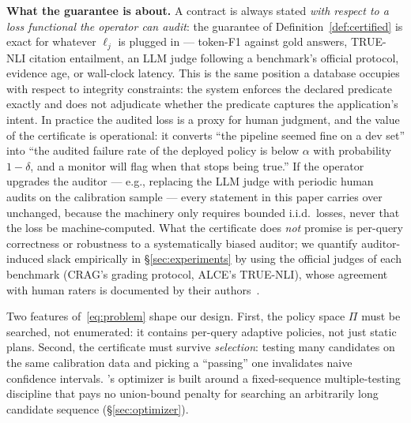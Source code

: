 \textbf{What the guarantee is about.} A contract is always stated
\emph{with respect to a loss functional the operator can audit}: the
guarantee of Definition~\ref{def:certified} is exact for whatever
$\ell_j$ is plugged in --- token-F1 against gold answers, TRUE-NLI
citation entailment, an LLM judge following a benchmark's official
protocol, evidence age, or wall-clock latency. This is the same position
a database occupies with respect to integrity constraints: the system
enforces the declared predicate exactly and does not adjudicate whether
the predicate captures the application's intent. In practice the audited
loss is a proxy for human judgment, and the value of the certificate is
operational: it converts ``the pipeline seemed fine on a dev set'' into
``the audited failure rate of the deployed policy is below $\alpha$ with
probability $1-\delta$, and a monitor will flag when that stops being
true.'' If the operator upgrades the auditor --- e.g., replacing the LLM
judge with periodic human audits on the calibration sample --- every
statement in this paper carries over unchanged, because the machinery
only requires bounded i.i.d.\ losses, never that the loss be
machine-computed. What the certificate does \emph{not} promise is
per-query correctness or robustness to a systematically biased auditor;
we quantify auditor-induced slack empirically in
\S\ref{sec:experiments} by using the official judges of each benchmark
(CRAG's grading protocol, ALCE's TRUE-NLI), whose agreement with human
raters is documented by their authors~\cite{yang2024cragbench,gao2023alce}.

Two features of~\eqref{eq:problem} shape our design. First, the policy
space $\Pi$ must be searched, not enumerated: it contains per-query adaptive
policies, not just static plans. Second, the certificate must survive
\emph{selection}: testing many candidates on the same calibration data and
picking a ``passing'' one invalidates naive confidence intervals. \system's
optimizer is built around a fixed-sequence multiple-testing discipline that
pays no union-bound penalty for searching an arbitrarily long candidate
sequence (\S\ref{sec:optimizer}).
